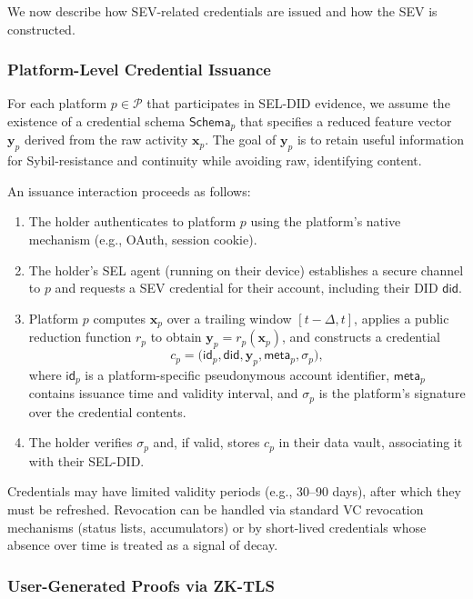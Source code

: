 \documentclass[11pt]{article}
\begin{document}
We now describe how SEV-related credentials are issued and how the SEV is constructed.

\subsubsection{Platform-Level Credential Issuance}

For each platform $p \in \mathcal{P}$ that participates in SEL-DID evidence, we assume the existence of a credential schema $\mathsf{Schema}_p$ that specifies a reduced feature vector $\mathbf{y}_p$ derived from the raw activity $\mathbf{x}_p$. The goal of $\mathbf{y}_p$ is to retain useful information for Sybil-resistance and continuity while avoiding raw, identifying content.

An issuance interaction proceeds as follows:

\begin{enumerate}
  \item The holder authenticates to platform $p$ using the platform's native mechanism (e.g., OAuth, session cookie).
  \item The holder's SEL agent (running on their device) establishes a secure channel to $p$ and requests a SEV credential for their account, including their DID $\mathsf{did}$.
  \item Platform $p$ computes $\mathbf{x}_p$ over a trailing window $[t - \Delta, t]$, applies a public reduction function $r_p$ to obtain $\mathbf{y}_p = r_p(\mathbf{x}_p)$, and constructs a credential
  \[
    c_p = \big( \mathsf{id}_p, \mathsf{did}, \mathbf{y}_p, \textsf{meta}_p, \sigma_p \big),
  \]
  where $\mathsf{id}_p$ is a platform-specific pseudonymous account identifier, $\textsf{meta}_p$ contains issuance time and validity interval, and $\sigma_p$ is the platform's signature over the credential contents.
  \item The holder verifies $\sigma_p$ and, if valid, stores $c_p$ in their data vault, associating it with their SEL-DID.
\end{enumerate}

Credentials may have limited validity periods (e.g., 30--90 days), after which they must be refreshed. Revocation can be handled via standard VC revocation mechanisms (status lists, accumulators) or by short-lived credentials whose absence over time is treated as a signal of decay.

\subsubsection{User-Generated Proofs via ZK-TLS}
\label{sec:zk_tls}
\end{document}
